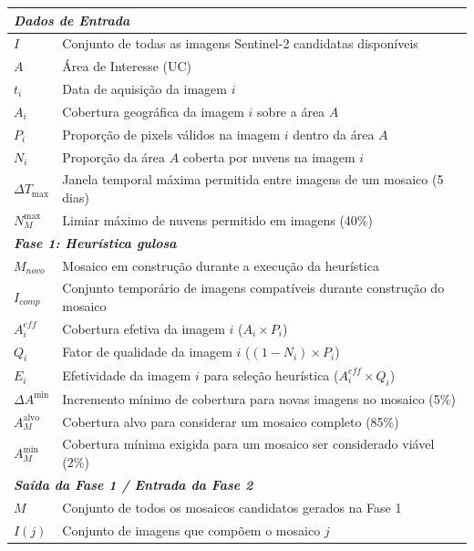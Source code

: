\documentclass[a4paper,11pt]{article}
\begin{document}
\begin{longtable}{@{ \extracolsep{\fill}}p{2.5cm}p{11.5cm}@{}}
    \multicolumn{2}{l}{\footnotesize\textit{\textbf{Dados de Entrada}}} \\
    \midrule
    $I$        & Conjunto de todas as imagens Sentinel-2 candidatas disponíveis \\
    $A$        & Área de Interesse (UC) \\
    $t_i$      & Data de aquisição da imagem $i$ \\
    $A_i$      & Cobertura geográfica da imagem $i$ sobre a área $A$ \\
    $P_i$      & Proporção de pixels válidos na imagem $i$ dentro da área $A$ \\
    $N_i$      & Proporção da área $A$ coberta por nuvens na imagem $i$ \\
    $\Delta T_{\max}$ & Janela temporal máxima permitida entre imagens de um mosaico (5 dias) \\
    $N_M^{\max}$ & Limiar máximo de nuvens permitido em imagens (40\%) \\[1pt]
    \midrule
    \multicolumn{2}{l}{\footnotesize\textit{\textbf{Fase 1: Heurística gulosa}}} \\
    \midrule
    $M_{novo}$ & Mosaico em construção durante a execução da heurística \\
    $I_{comp}$ & Conjunto temporário de imagens compatíveis durante construção do mosaico \\
    $A_i^{eff}$ & Cobertura efetiva da imagem $i$ ($A_i \times P_i$) \\
    $Q_i$      & Fator de qualidade da imagem $i$ ($(1 - N_i) \times P_i$) \\
    $E_i$      & Efetividade da imagem $i$ para seleção heurística ($A_i^{eff} \times Q_i$) \\
    $\Delta A^{\min}$ & Incremento mínimo de cobertura para novas imagens no mosaico (5\%)\\
    $A_M^{\text{alvo}}$ & Cobertura alvo para considerar um mosaico completo (85\%) \\
    $A_M^{\min}$ & Cobertura mínima exigida para um mosaico ser considerado viável (2\%) \\[1pt]
    \midrule
    \multicolumn{2}{l}{\footnotesize\textit{\textbf{Saída da Fase 1 / Entrada da Fase 2}}} \\
    \midrule
    $M$        & Conjunto de todos os mosaicos candidatos gerados na Fase 1 \\
    $I(j)$     & Conjunto de imagens que compõem o mosaico $j$ \\

\end{longtable}
\end{document}
